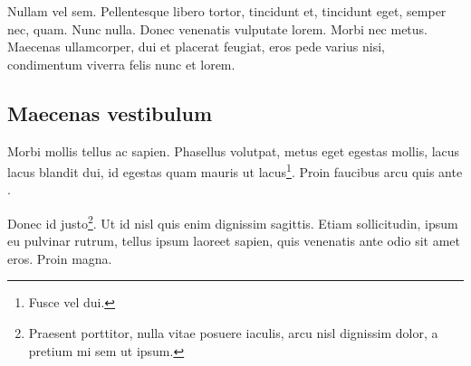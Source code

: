 Nullam vel sem. Pellentesque libero tortor, tincidunt et, tincidunt eget, semper nec, quam. Nunc nulla. Donec venenatis vulputate lorem. Morbi nec metus. Maecenas ullamcorper, dui et placerat feugiat, eros pede varius nisi, condimentum viverra felis nunc et lorem.

\subsection{Maecenas vestibulum}

Morbi mollis tellus ac sapien. Phasellus volutpat, metus eget egestas mollis, lacus lacus blandit dui, id egestas quam mauris ut lacus\footnote{Fusce vel dui.}. Proin faucibus arcu quis ante \cite{web:OSG}.

Donec id justo\footnote{Praesent porttitor, nulla vitae posuere iaculis, arcu nisl dignissim dolor, a pretium mi sem ut ipsum.}. Ut id nisl quis enim dignissim sagittis. Etiam sollicitudin, ipsum eu pulvinar rutrum, tellus ipsum laoreet sapien, quis venenatis ante odio sit amet eros. Proin magna.

